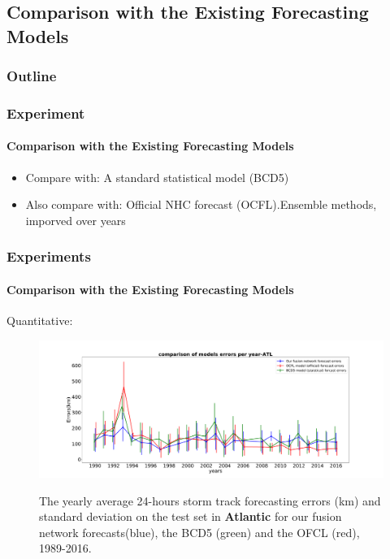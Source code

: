 \documentclass{beamer}
\begin{document}
\subsection{Comparison with the Existing Forecasting Models}
\begin{frame}
\frametitle{Outline} %
\tableofcontents[currentsubsection] %
\end{frame}

\begin{frame}
\frametitle{Experiment} 
\framesubtitle{Comparison with the Existing Forecasting Models}
\begin{itemize}
	\item Compare with: A standard statistical model (BCD5)
	\item Also compare with: Official NHC forecast (OCFL).Ensemble methods, imporved over years
	
\end{itemize}
\end{frame}


\begin{frame}
\frametitle{Experiments}
\framesubtitle{Comparison with the Existing Forecasting Models}
Quantitative: 
\begin{figure}
	\includegraphics[width=1.0\linewidth]{figs/ATL_comparison_of_models_errors_per_year.pdf}\\
	\caption{The yearly average 24-hours storm track forecasting errors (km) and standard deviation on the test set in \textbf{Atlantic} for our fusion network forecasts(blue), the BCD5 (green) and the OFCL (red), 1989-2016.}
\end{figure}
\end{frame}
\end{document}
